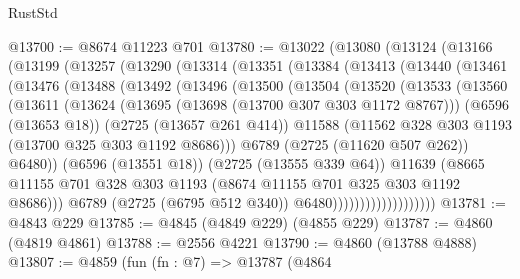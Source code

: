 \begin{lexlean}{RustStd}
\begin{coremodule}
@13700 := @8674 @11223 @701
@13780 := @13022
    (@13080
      (@13124
        (@13166
          (@13199
            (@13257
              (@13290
                (@13314
                  (@13351
                    (@13384
                      (@13413
                        (@13440
                          (@13461
                            (@13476
                              (@13488
                                (@13492
                                  (@13496
                                    (@13500
                                      (@13504
                                        (@13520
                                          (@13533
                                            (@13560
                                              (@13611
                                                (@13624
                                                  (@13695 (@13698 (@13700 @307 @303 @1172 @8767)))
                                                  (@6596 (@13653 @18))
                                                  (@2725 (@13657 @261 @414))
                                                  @11588
                                                  (@11562
                                                    @328
                                                    @303
                                                    @1193
                                                    (@13700 @325 @303 @1192 @8686)))
                                                @6789
                                                (@2725 (@11620 @507 @262))
                                                @6480))
                                            (@6596 (@13551 @18))
                                            (@2725 (@13555 @339 @64))
                                            @11639
                                            (@8665
                                              @11155
                                              @701
                                              @328
                                              @303
                                              @1193
                                              (@8674 @11155 @701 @325 @303 @1192 @8686)))
                                          @6789
                                          (@2725 (@6795 @512 @340))
                                          @6480)))))))))))))))))))
@13781 := @4843 @229
@13785 := @4845 (@4849 @229) (@4855 @229)
@13787 := @4860 (@4819 @4861)
@13788 := @2556 @4221
@13790 := @4860 (@13788 @4888)
@13807 := @4859
    (fun (fn : @7) =>
    @13787
      (@4864

\end{coremodule}
\end{lexlean}
